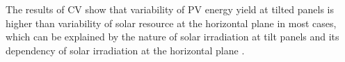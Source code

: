 The results of CV show that variability of PV energy yield at tilted panels is higher than variability of solar resource at the horizontal plane in most cases, which can be explained by the nature of solar irradiation at tilt panels and its dependency of solar irradiation at the horizontal plane \cite{Perpinan2009}.


 


